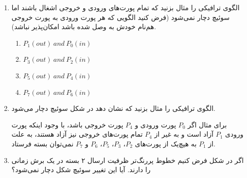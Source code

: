 \begin{enumerate}
	\item 
	
	الگوی ترافیکی را مثال بزنید که تمام پورت‌های ورودی و خروجی اشغال باشند اما سوئیچ دچار  نمی‌شود
	(فرض کنید الگویی که هر پورت ورودی به پورت خروجی هم‌نام خودش  به  وصل شده باشد امکان‌پذیر نباشد).
	\begin{qsolve}
		\begin{latin}
			\begin{enumerate}
				\item 
				$P_1(out) \ and \ P_0(in)$
				
				\item 
				$P_3(out) \ and \ P_2(in)$
				
				\item 
				$P_5(out) \ and \ P_4(in)$
				
				\item 
				$P_7(out) \ and \ P_6(in)$
			\end{enumerate}
		\end{latin}
	\end{qsolve}
	
	
	\item 
	الگوی ترافیکی را مثال بزنید که نشان دهد در شکل  سوئیچ دچار  می‌شود.
	
	\begin{qsolve}
		برای مثال اگر $P_0$ پورت ورودی و $P_4$ پورت خروجی باشد، با وجود اینکه پورت ورودی $P_1$ آزاد است و به غیر از $P_4$ تمام پورت‌های خروجی نیز آزاد هستند، به علت  از $P_1$ به هیچ‌یک از پورت‌های $P_2$، $P_3$، $P_5$، $P_6$ و $P_7$ نمی‌توان بسته فرستاد.
	\end{qsolve}
	
	
	
	\item 
	اگر در شکل  فرض کنیم خطوط پررنگ‌تر ظرفیت ارسال ۲ بسته در یک برش زمانی را دارند. آیا این تغییر سوئیچ شکل  دچار  نمی‌شود؟ 
	
		
\end{enumerate}
\newpage


